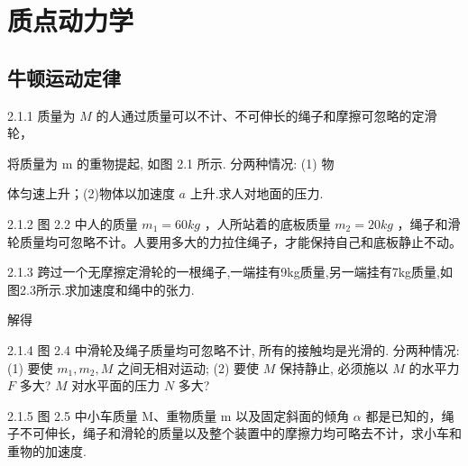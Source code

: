\chapter{质点动力学}

\section{牛顿运动定律}

\begin{problem}{2.1.1}
质量为 $M$ 的人通过质量可以不计、不可伸长的绳子和摩擦可忽略的定滑轮，

将质量为 m 的重物提起, 如图 2.1 所示. 分两种情况: (1) 物

体匀速上升；(2)物体以加速度 $a$ 上升.求人对地面的压力.
\begin{center}

\end{center}
\end{problem}
\clearpage


\begin{problem}{2.1.2}
图 2.2 中人的质量 $m_{1}=60kg$ ，人所站着的底板质量 $m_{2}=20kg$ ，绳子和滑轮质量均可忽略不计。人要用多大的力拉住绳子，才能保持自己和底板静止不动。
\begin{center}

\end{center}
\end{problem}
\clearpage


\begin{problem}{2.1.3}
跨过一个无摩擦定滑轮的一根绳子,一端挂有9kg质量,另一端挂有7kg质量,如图2.3所示.求加速度和绳中的张力.

解得
\begin{center}

\end{center}
\end{problem}
\clearpage


\begin{problem}{2.1.4}
图 2.4 中滑轮及绳子质量均可忽略不计, 所有的接触均是光滑的. 分两种情况: (1) 要使 $m_{1}, m_{2}, M$ 之间无相对运动; (2) 要使 $M$ 保持静止, 必须施以 $M$ 的水平力 $F$ 多大? $M$ 对水平面的压力 $N$ 多大?
\begin{center}

\end{center}
\end{problem}
\clearpage


\begin{problem}{2.1.5}
图 2.5 中小车质量 M、重物质量 m 以及固定斜面的倾角 $\alpha$ 都是已知的，绳子不可伸长，绳子和滑轮的质量以及整个装置中的摩擦力均可略去不计，求小车和重物的加速度.
\begin{center}

\end{center}
\end{problem}
\clearpage


